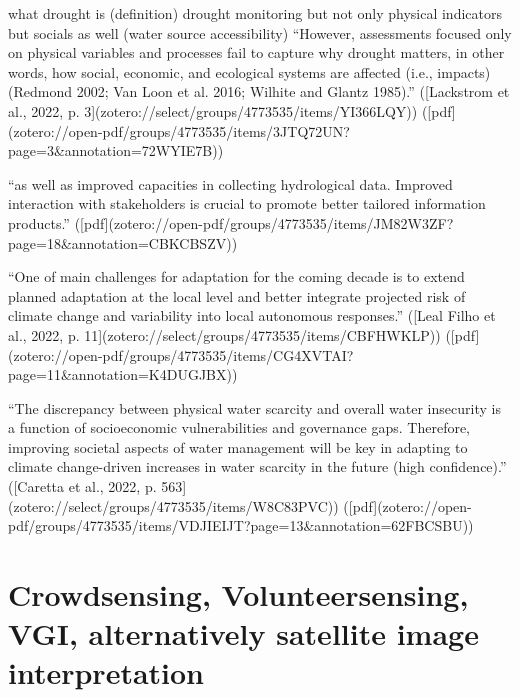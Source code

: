 {%
what drought is (definition)
drought monitoring but not only physical indicators but socials as well (water source accessibility) “However, assessments focused only on physical variables and processes fail to capture why drought matters, in other words, how social, economic, and ecological systems are affected (i.e., impacts) (Redmond 2002; Van Loon et al. 2016; Wilhite and Glantz 1985).” ([Lackstrom et al., 2022, p. 3](zotero://select/groups/4773535/items/YI366LQY)) ([pdf](zotero://open-pdf/groups/4773535/items/3JTQ72UN?page=3\&annotation=72WYIE7B))

“as well as improved capacities in collecting hydrological data. Improved interaction with stakeholders is crucial to promote better tailored information products.” ([pdf](zotero://open-pdf/groups/4773535/items/JM82W3ZF?page=18&annotation=CBKCBSZV))

“One of main challenges for adaptation for the coming decade is to extend planned adaptation at the local level and better integrate projected risk of climate change and variability into local autonomous responses.” ([Leal Filho et al., 2022, p. 11](zotero://select/groups/4773535/items/CBFHWKLP)) ([pdf](zotero://open-pdf/groups/4773535/items/CG4XVTAI?page=11&annotation=K4DUGJBX))

“The discrepancy between physical water scarcity and overall water insecurity is a function of socioeconomic vulnerabilities and governance gaps. Therefore, improving societal aspects of water management will be key in adapting to climate change-driven increases in water scarcity in the future (high confidence).” ([Caretta et al., 2022, p. 563](zotero://select/groups/4773535/items/W8C83PVC)) ([pdf](zotero://open-pdf/groups/4773535/items/VDJIEIJT?page=13&annotation=62FBCSBU))




\section{Crowdsensing, Volunteersensing, VGI,  alternatively satellite image interpretation}



}
